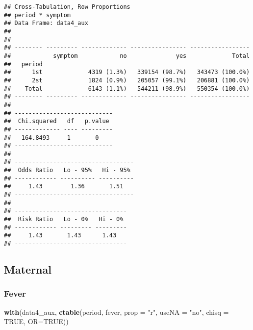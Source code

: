 \documentclass[
]{article}
\newenvironment{Shaded}{\begin{snugshade}}{\end{snugshade}}
\newcommand{\DataTypeTok}[1]{\textcolor[rgb]{0.13,0.29,0.53}{#1}}
\newcommand{\KeywordTok}[1]{\textcolor[rgb]{0.13,0.29,0.53}{\textbf{#1}}}
\newcommand{\NormalTok}[1]{#1}
\newcommand{\OperatorTok}[1]{\textcolor[rgb]{0.81,0.36,0.00}{\textbf{#1}}}
\newcommand{\OtherTok}[1]{\textcolor[rgb]{0.56,0.35,0.01}{#1}}
\newcommand{\StringTok}[1]{\textcolor[rgb]{0.31,0.60,0.02}{#1}}
\begin{document}
\begin{verbatim}
## Cross-Tabulation, Row Proportions  
## period * symptom  
## Data Frame: data4_aux  
## 
## 
## -------- --------- ------------- ---------------- -----------------
##            symptom            no              yes             Total
##   period                                                           
##      1st             4319 (1.3%)   339154 (98.7%)   343473 (100.0%)
##      2st             1824 (0.9%)   205057 (99.1%)   206881 (100.0%)
##    Total             6143 (1.1%)   544211 (98.9%)   550354 (100.0%)
## -------- --------- ------------- ---------------- -----------------
## 
## ----------------------------
##  Chi.squared   df   p.value 
## ------------- ---- ---------
##   164.8493     1       0    
## ----------------------------
## 
## ----------------------------------
##  Odds Ratio   Lo - 95%   Hi - 95% 
## ------------ ---------- ----------
##     1.43        1.36       1.51   
## ----------------------------------
## 
## --------------------------------
##  Risk Ratio   Lo - 0%   Hi - 0% 
## ------------ --------- ---------
##     1.43       1.43      1.43   
## --------------------------------
\end{verbatim}

\hypertarget{maternal-2}{%
\subsection{Maternal}\label{maternal-2}}

\begin{Shaded}
\end{Shaded}

\hypertarget{fever-2}{%
\subsubsection{Fever}\label{fever-2}}

\begin{Shaded}
\begin{Highlighting}[]
\KeywordTok{with}\NormalTok{(data4_aux, }\KeywordTok{ctable}\NormalTok{(period, fever, }\DataTypeTok{prop =} \StringTok{"r"}\NormalTok{, }\DataTypeTok{useNA =} \StringTok{"no"}\NormalTok{, }\DataTypeTok{chisq =} \OtherTok{TRUE}\NormalTok{, }\DataTypeTok{OR=}\OtherTok{TRUE}\NormalTok{))}
\end{Highlighting}
\end{Shaded}
\end{document}
